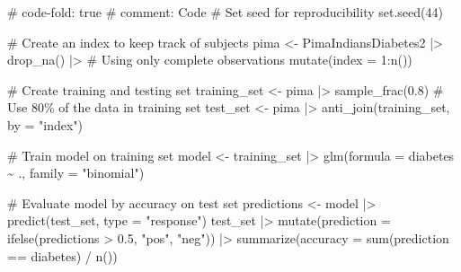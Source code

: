 \documentclass[
  letterpaper,
  DIV=11,
  numbers=noendperiod]{scrreprt}
\newenvironment{Shaded}{\begin{snugshade}}{\end{snugshade}}
\newcommand{\AttributeTok}[1]{\textcolor[rgb]{0.40,0.45,0.13}{#1}}
\newcommand{\CommentTok}[1]{\textcolor[rgb]{0.37,0.37,0.37}{#1}}
\newcommand{\DecValTok}[1]{\textcolor[rgb]{0.68,0.00,0.00}{#1}}
\newcommand{\FloatTok}[1]{\textcolor[rgb]{0.68,0.00,0.00}{#1}}
\newcommand{\FunctionTok}[1]{\textcolor[rgb]{0.28,0.35,0.67}{#1}}
\newcommand{\NormalTok}[1]{\textcolor[rgb]{0.00,0.23,0.31}{#1}}
\newcommand{\OtherTok}[1]{\textcolor[rgb]{0.00,0.23,0.31}{#1}}
\newcommand{\SpecialCharTok}[1]{\textcolor[rgb]{0.37,0.37,0.37}{#1}}
\newcommand{\StringTok}[1]{\textcolor[rgb]{0.13,0.47,0.30}{#1}}
\begin{document}
\begin{Shaded}
\begin{Highlighting}[]
\CommentTok{\# code{-}fold: true}
\CommentTok{\# comment: Code}
\CommentTok{\# Set seed for reproducibility}
\FunctionTok{set.seed}\NormalTok{(}\DecValTok{44}\NormalTok{) }

\CommentTok{\# Create an index to keep track of subjects}
\NormalTok{pima }\OtherTok{\textless{}{-}}\NormalTok{ PimaIndiansDiabetes2 }\SpecialCharTok{|\textgreater{}} 
  \FunctionTok{drop\_na}\NormalTok{() }\SpecialCharTok{|\textgreater{}} \CommentTok{\# Using only complete observations}
  \FunctionTok{mutate}\NormalTok{(}\AttributeTok{index =} \DecValTok{1}\SpecialCharTok{:}\FunctionTok{n}\NormalTok{())}

\CommentTok{\# Create training and testing set}
\NormalTok{training\_set }\OtherTok{\textless{}{-}}\NormalTok{ pima }\SpecialCharTok{|\textgreater{}} 
  \FunctionTok{sample\_frac}\NormalTok{(}\FloatTok{0.8}\NormalTok{) }\CommentTok{\# Use 80\% of the data in training set}
\NormalTok{test\_set }\OtherTok{\textless{}{-}}\NormalTok{ pima }\SpecialCharTok{|\textgreater{}} 
  \FunctionTok{anti\_join}\NormalTok{(training\_set, }\AttributeTok{by =} \StringTok{"index"}\NormalTok{)}

\CommentTok{\# Train model on training set}
\NormalTok{model }\OtherTok{\textless{}{-}}\NormalTok{ training\_set }\SpecialCharTok{|\textgreater{}} 
  \FunctionTok{glm}\NormalTok{(}\AttributeTok{formula =}\NormalTok{ diabetes }\SpecialCharTok{\textasciitilde{}}\NormalTok{ ., }\AttributeTok{family =} \StringTok{"binomial"}\NormalTok{)}

\CommentTok{\# Evaluate model by accuracy on test set}
\NormalTok{predictions }\OtherTok{\textless{}{-}}\NormalTok{ model }\SpecialCharTok{|\textgreater{}} 
  \FunctionTok{predict}\NormalTok{(test\_set, }\AttributeTok{type =} \StringTok{"response"}\NormalTok{)}
\NormalTok{test\_set }\SpecialCharTok{|\textgreater{}} 
  \FunctionTok{mutate}\NormalTok{(}\AttributeTok{prediction =} \FunctionTok{ifelse}\NormalTok{(predictions }\SpecialCharTok{\textgreater{}} \FloatTok{0.5}\NormalTok{, }\StringTok{"pos"}\NormalTok{, }\StringTok{"neg"}\NormalTok{)) }\SpecialCharTok{|\textgreater{}} 
  \FunctionTok{summarize}\NormalTok{(}\AttributeTok{accuracy =} \FunctionTok{sum}\NormalTok{(prediction }\SpecialCharTok{==}\NormalTok{ diabetes) }\SpecialCharTok{/} \FunctionTok{n}\NormalTok{())}
\end{Highlighting}
\end{Shaded}
\end{document}
